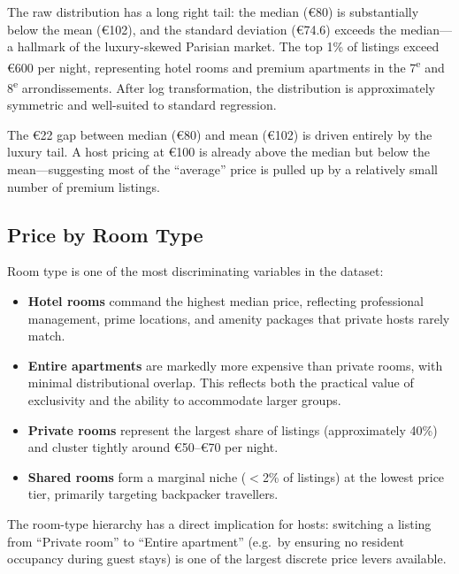 \documentclass[12pt, a4paper]{article}
\begin{document}
The raw distribution has a long right tail: the median (\euro{}80) is substantially below the mean (\euro{}102), and the standard deviation (\euro{}74.6) exceeds the median---a hallmark of the luxury-skewed Parisian market. The top 1\% of listings exceed \euro{}600 per night, representing hotel rooms and premium apartments in the 7\textsuperscript{e} and 8\textsuperscript{e} arrondissements. After log transformation, the distribution is approximately symmetric and well-suited to standard regression.

\begin{insightbox}
The \euro{}22 gap between median (\euro{}80) and mean (\euro{}102) is driven entirely by the luxury tail. A host pricing at \euro{}100 is already above the median but below the mean---suggesting most of the ``average'' price is pulled up by a relatively small number of premium listings.
\end{insightbox}

\subsection{Price by Room Type}

Room type is one of the most discriminating variables in the dataset:

\begin{itemize}[itemsep=3pt]
  \item \textbf{Hotel rooms} command the highest median price, reflecting professional management, prime locations, and amenity packages that private hosts rarely match.
  \item \textbf{Entire apartments} are markedly more expensive than private rooms, with minimal distributional overlap. This reflects both the practical value of exclusivity and the ability to accommodate larger groups.
  \item \textbf{Private rooms} represent the largest share of listings (approximately 40\%) and cluster tightly around \euro{}50--\euro{}70 per night.
  \item \textbf{Shared rooms} form a marginal niche ($<$2\% of listings) at the lowest price tier, primarily targeting backpacker travellers.
\end{itemize}

The room-type hierarchy has a direct implication for hosts: switching a listing from ``Private room'' to ``Entire apartment'' (e.g.\ by ensuring no resident occupancy during guest stays) is one of the largest discrete price levers available.
\end{document}
